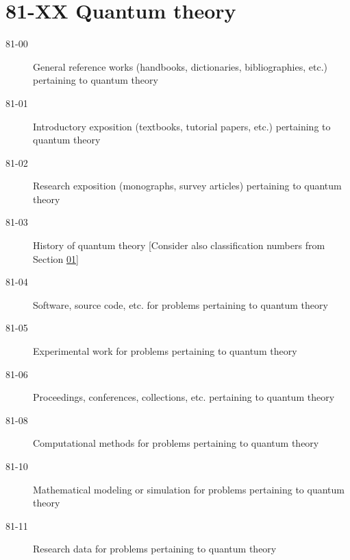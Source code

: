 \documentclass[letterpaper]{article}
\begin{document}
\section*{81-XX Quantum theory }\label{81-XX}
\begin{description}
\item [81-00]\label{81-00} General reference works (handbooks, dictionaries, bibliographies, etc.) pertaining to quantum theory
\item [81-01]\label{81-01} Introductory exposition (textbooks, tutorial papers, etc.) pertaining to quantum theory
\item [81-02]\label{81-02} Research exposition (monographs, survey articles) pertaining to quantum theory
\item [81-03]\label{81-03} History of quantum theory [Consider also classification numbers from Section \hyperref[01-XX]{01}]
\item [81-04]\label{81-04} Software, source code, etc. for problems pertaining to quantum theory
\item [81-05]\label{81-05} Experimental work for problems pertaining to quantum theory
\item [81-06]\label{81-06} Proceedings, conferences, collections, etc. pertaining to quantum theory
\item [81-08]\label{81-08} Computational methods for problems pertaining to quantum theory
\item [81-10]\label{81-10} Mathematical modeling or simulation for problems pertaining to quantum theory
\item [81-11]\label{81-11} Research data for problems pertaining to quantum theory
\end{description}
\end{document}
